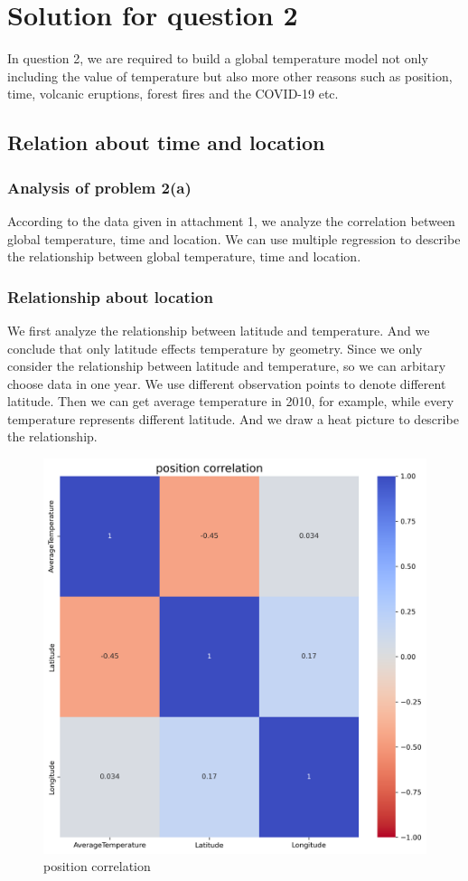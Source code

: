 \documentclass{apmcmthesis}
\begin{document}
\section{Solution for question 2}
In question 2, we are required to build a global temperature model not only including the value of temperature 
but also more other reasons such as position, time, volcanic eruptions, forest fires and the COVID-19 etc.

\subsection{Relation about time and location}
\subsubsection{Analysis of problem 2(a)}
According to the data given in attachment 1, we analyze the correlation between global temperature, time and location.
We can use multiple regression to describe the relationship between global temperature, time and location. 

\subsubsection{Relationship about location}
We first analyze the relationship between latitude and temperature. 
And we conclude that only latitude effects temperature by geometry.
Since we only consider the relationship between latitude and temperature, so we can arbitary choose data in one year.
We use different observation points to denote different latitude.
Then we can get average temperature in 2010, for example, while every temperature represents different latitude. 
And we draw a heat picture to describe the relationship.

\begin{figure}[htbp]
  \centering
  \includegraphics[scale=0.4]{position correlation.png}
  \caption{position correlation}
\end{figure}
\end{document}
